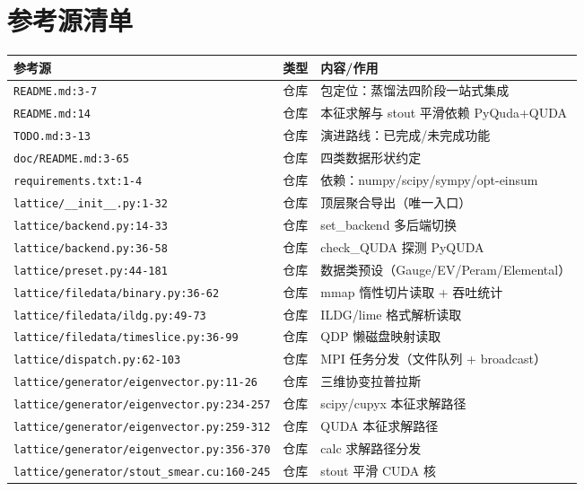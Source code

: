 \documentclass[UTF8]{ctexart}
\begin{document}
\section{参考源清单}
\begin{xltabular}{\textwidth}{llX}
\toprule
\textcolor{evidence}{参考源} & 类型 & 内容/作用 \\
\midrule
\endhead
\texttt{\nolinkurl{README.md:3-7}} & 仓库 & 包定位：蒸馏法四阶段一站式集成 \\
\texttt{\nolinkurl{README.md:14}} & 仓库 & 本征求解与 stout 平滑依赖 PyQuda+QUDA \\
\texttt{\nolinkurl{TODO.md:3-13}} & 仓库 & 演进路线：已完成/未完成功能 \\
\texttt{\nolinkurl{doc/README.md:3-65}} & 仓库 & 四类数据形状约定 \\
\texttt{\nolinkurl{requirements.txt:1-4}} & 仓库 & 依赖：numpy/scipy/sympy/opt-einsum \\
\texttt{\nolinkurl{lattice/__init__.py:1-32}} & 仓库 & 顶层聚合导出（唯一入口） \\
\texttt{\nolinkurl{lattice/backend.py:14-33}} & 仓库 & set\_backend 多后端切换 \\
\texttt{\nolinkurl{lattice/backend.py:36-58}} & 仓库 & check\_QUDA 探测 PyQUDA \\
\texttt{\nolinkurl{lattice/preset.py:44-181}} & 仓库 & 数据类预设（Gauge/EV/Peram/Elemental） \\
\texttt{\nolinkurl{lattice/filedata/binary.py:36-62}} & 仓库 & mmap 惰性切片读取 + 吞吐统计 \\
\texttt{\nolinkurl{lattice/filedata/ildg.py:49-73}} & 仓库 & ILDG/lime 格式解析读取 \\
\texttt{\nolinkurl{lattice/filedata/timeslice.py:36-99}} & 仓库 & QDP 懒磁盘映射读取 \\
\texttt{\nolinkurl{lattice/dispatch.py:62-103}} & 仓库 & MPI 任务分发（文件队列 + broadcast） \\
\texttt{\nolinkurl{lattice/generator/eigenvector.py:11-26}} & 仓库 & 三维协变拉普拉斯 \\
\texttt{\nolinkurl{lattice/generator/eigenvector.py:234-257}} & 仓库 & scipy/cupyx 本征求解路径 \\
\texttt{\nolinkurl{lattice/generator/eigenvector.py:259-312}} & 仓库 & QUDA 本征求解路径 \\
\texttt{\nolinkurl{lattice/generator/eigenvector.py:356-370}} & 仓库 & calc 求解路径分发 \\
\texttt{\nolinkurl{lattice/generator/stout_smear.cu:160-245}} & 仓库 & stout 平滑 CUDA 核 \\

\end{xltabular}
\end{document}

